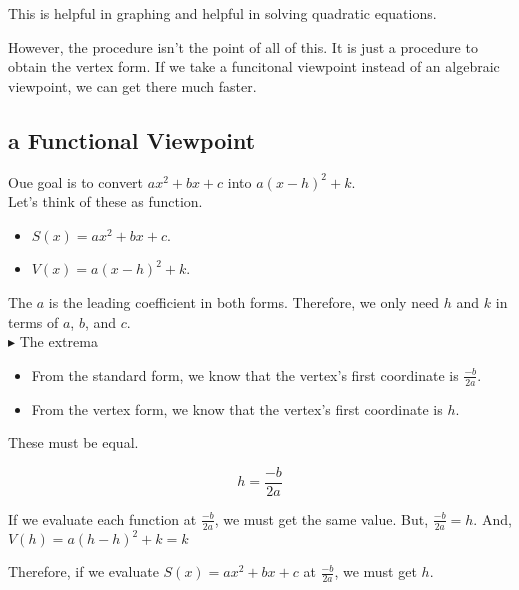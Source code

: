 \documentclass{ximera}
\begin{document}
This is helpful in graphing and helpful in solving quadratic equations.


However, the procedure isn't the point of all of this.  It is just a procedure to obtain the vertex form.  If we take a funcitonal viewpoint instead of an algebraic viewpoint, we can get there much faster.






\subsection{a Functional Viewpoint}



Oue goal is to convert $a x^2 + b x + c$ into $a (x - h)^2 + k$. \\

Let's think of these as function.


\begin{itemize}
\item $S(x) = a x^2 + b x + c$.
\item $V(x) = a (x - h)^2 + k$.
\end{itemize}



The $a$ is the leading coefficient in both forms.  Therefore, we only need $h$ and $k$ in terms of $a$, $b$, and $c$. \\




\textbf{\textcolor{blue!55!black}{$\blacktriangleright$}}  The extrema \\



\begin{itemize}
\item From the standard form, we know that the vertex's first coordinate is $\frac{-b}{2 a}$.
\item From the vertex form, we know that the vertex's first coordinate is $h$.
\end{itemize}


These must be equal.

\[
h = \frac{-b}{2 a}
\]



If we evaluate each function at $\frac{-b}{2 a}$, we must get the same value.  But, $\frac{-b}{2 a} = h$.  And, $V(h) = a (h - h)^2 + k = k$

Therefore, if we evaluate $S(x) = a x^2 + b x + c$ at $\frac{-b}{2 a}$, we must get $h$.
\end{document}
